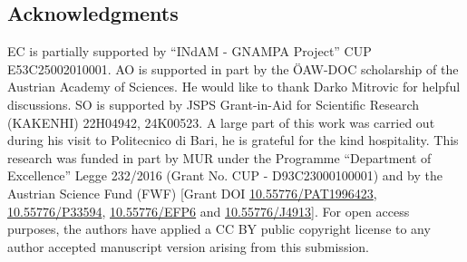\documentclass[a4paper,11pt]{article}
\numberwithin{equation}{section}
\theoremstyle{definition}
\theoremstyle{plain}
\begin{document}
\subsection*{Acknowledgments}
EC is partially supported  by ``INdAM - GNAMPA Project''  CUP E53C25002010001.
AO is supported in part by the \"OAW-DOC scholarship of the Austrian Academy of Sciences. He would like to thank Darko Mitrovic for helpful discussions.
SO is supported by JSPS Grant-in-Aid for Scientific Research (KAKENHI) 22H04942, 24K00523.
A large part of this work was carried out during his visit to Politecnico di Bari, he is grateful for the kind hospitality.
%
This research was funded in part by   MUR under the Programme ``Department of Excellence'' Legge 232/2016  (Grant No. CUP - D93C23000100001) and by the Austrian Science Fund (FWF) [Grant DOI \href{https://doi.org/10.55776/PAT1996423}{10.55776/PAT1996423}, \href{https://doi.org/10.55776/P33594}{10.55776/P33594}, \href{https://doi.org/10.55776/EFP6}{10.55776/EFP6} and \href{https://doi.org/10.55776/J4913}{10.55776/J4913}]. For open access purposes, the authors have applied a CC BY public copyright license to any author accepted manuscript version arising from this submission.
\end{document}
